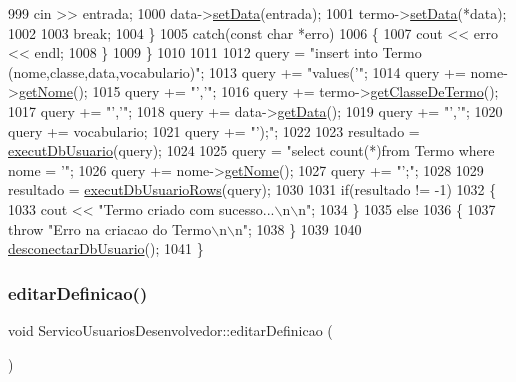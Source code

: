 \begin{DoxyCode}
999     cin >> entrada;
1000     data->\mbox{\hyperlink{class_data_a5245638838a033c98a8b760836dddb7d}{setData}}(entrada);
1001     termo->\mbox{\hyperlink{class_termo_abf829a90ed067a580bb9d4c90db0f160}{setData}}(*data);
1002 
1003     \textcolor{keywordflow}{break};
1004   \}
1005   \textcolor{keywordflow}{catch}(\textcolor{keyword}{const} \textcolor{keywordtype}{char} *erro)
1006   \{
1007     cout << erro << endl;
1008   \}
1009 \}
1010 
1011 
1012   query = \textcolor{stringliteral}{"insert into Termo (nome,classe,data,vocabulario)"};
1013   query += \textcolor{stringliteral}{"values('"};
1014   query += nome->\mbox{\hyperlink{class_nome_aad41176173eec20cbbae1576447a3697}{getNome}}();
1015   query += \textcolor{stringliteral}{"','"};
1016   query += termo->\mbox{\hyperlink{class_termo_ae7e8fb47c8e03506b98a952fa25aa97b}{getClasseDeTermo}}();
1017   query += \textcolor{stringliteral}{"','"};
1018   query += data->\mbox{\hyperlink{class_data_afc7b15a5e81334858e48709b2f45cdc3}{getData}}();
1019   query += \textcolor{stringliteral}{"','"};
1020   query += vocabulario;
1021   query += \textcolor{stringliteral}{"');"};
1022 
1023   resultado = \mbox{\hyperlink{comando_sql_8cpp_a748197580e7f9acdbf48c78de1f7924b}{executDbUsuario}}(query);
1024 
1025   query = \textcolor{stringliteral}{"select count(*)from Termo where nome = '"};
1026   query += nome->\mbox{\hyperlink{class_nome_aad41176173eec20cbbae1576447a3697}{getNome}}();
1027   query += \textcolor{stringliteral}{"';"};
1028 
1029   resultado = \mbox{\hyperlink{comando_sql_8cpp_af54952694f2fa7d76f969fb74b853cb9}{executDbUsuarioRows}}(query);
1030 
1031   \textcolor{keywordflow}{if}(resultado != -1)
1032   \{
1033     cout << \textcolor{stringliteral}{"Termo criado com sucesso...\(\backslash\)n\(\backslash\)n"};
1034   \}
1035   \textcolor{keywordflow}{else}
1036   \{
1037     \textcolor{keywordflow}{throw} \textcolor{stringliteral}{"Erro na criacao do Termo\(\backslash\)n\(\backslash\)n"};
1038   \}
1039 
1040   \mbox{\hyperlink{comando_sql_8cpp_a969be9911913568e30d4ae8963338bc3}{desconectarDbUsuario}}();
1041 \}
\end{DoxyCode}
\mbox{\label{class_servico_usuarios_desenvolvedor_a2a1063014d21344c6ec9a101741e5a4e}} 
\subsubsection{\texorpdfstring{editar\+Definicao()}{editarDefinicao()}}
{\footnotesize\ttfamily void Servico\+Usuarios\+Desenvolvedor\+::editar\+Definicao (\begin{DoxyParamCaption}{ }\end{DoxyParamCaption})\hspace{0.3cm}{\ttfamily [virtual]}}


